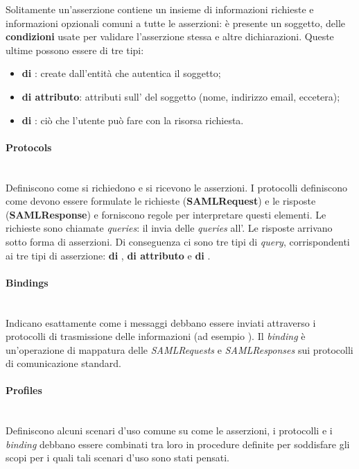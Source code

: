 Solitamente un'asserzione contiene un insieme di informazioni richieste e informazioni opzionali comuni a tutte le asserzioni: è presente un soggetto, delle \textbf{condizioni} usate per validare l'asserzione stessa e altre dichiarazioni. Queste ultime possono essere di tre tipi:
\begin{itemize}
\item \textbf{di }: create dall'entità che autentica il soggetto;
\item \textbf{di attributo}: attributi sull' del soggetto (nome, indirizzo email, eccetera);
\item \textbf{di }: ciò che l'utente può fare con la risorsa richiesta.
\end{itemize}

\paragraph{Protocols} \mbox{} \\
Definiscono come si richiedono e si ricevono le asserzioni. I protocolli definiscono come devono essere formulate le richieste (\textbf{SAMLRequest}) e le risposte (\textbf{SAMLResponse}) e forniscono regole per interpretare questi elementi. Le richieste sono chiamate \textit{queries}: il  invia delle \textit{queries} all'. Le risposte arrivano sotto forma di asserzioni. Di conseguenza ci sono tre tipi di \textit{query}, corrispondenti ai tre tipi di asserzione: \textbf{di }, \textbf{di attributo} e \textbf{di }.

\paragraph{Bindings} \mbox{} \\
Indicano esattamente come i messaggi  debbano essere inviati attraverso i protocolli di trasmissione delle informazioni (ad esempio ). Il \textit{binding} è un'operazione di mappatura delle \textit{SAMLRequests} e \textit{SAMLResponses} sui protocolli di comunicazione standard.

\paragraph{Profiles} \mbox{} \\
Definiscono alcuni scenari d’uso comune su come le asserzioni, i protocolli e i \textit{binding} debbano essere combinati tra loro in procedure definite per soddisfare gli scopi per i quali tali scenari d’uso sono stati pensati.